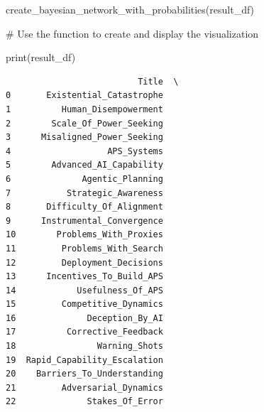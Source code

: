 \documentclass[
  11pt,
  letterpaper,
]{book}
\newenvironment{Shaded}{\begin{snugshade}}{\end{snugshade}}
\newcommand{\BuiltInTok}[1]{\textcolor[rgb]{0.00,0.23,0.31}{#1}}
\newcommand{\CommentTok}[1]{\textcolor[rgb]{0.37,0.37,0.37}{#1}}
\newcommand{\NormalTok}[1]{\textcolor[rgb]{0.00,0.23,0.31}{#1}}
\begin{document}
\begin{Shaded}
\begin{Highlighting}[]
\NormalTok{create\_bayesian\_network\_with\_probabilities(result\_df)}
\end{Highlighting}
\end{Shaded}

\begin{Shaded}
\begin{Highlighting}[]
\CommentTok{\# Use the function to create and display the visualization}

\BuiltInTok{print}\NormalTok{(result\_df)}
\end{Highlighting}
\end{Shaded}

\begin{verbatim}
                          Title  \
0       Existential_Catastrophe   
1          Human_Disempowerment   
2        Scale_Of_Power_Seeking   
3      Misaligned_Power_Seeking   
4                   APS_Systems   
5        Advanced_AI_Capability   
6              Agentic_Planning   
7           Strategic_Awareness   
8       Difficulty_Of_Alignment   
9      Instrumental_Convergence   
10        Problems_With_Proxies   
11         Problems_With_Search   
12         Deployment_Decisions   
13      Incentives_To_Build_APS   
14            Usefulness_Of_APS   
15         Competitive_Dynamics   
16              Deception_By_AI   
17          Corrective_Feedback   
18                Warning_Shots   
19  Rapid_Capability_Escalation   
20    Barriers_To_Understanding   
21         Adversarial_Dynamics   
22              Stakes_Of_Error   


\end{verbatim}
\end{document}
